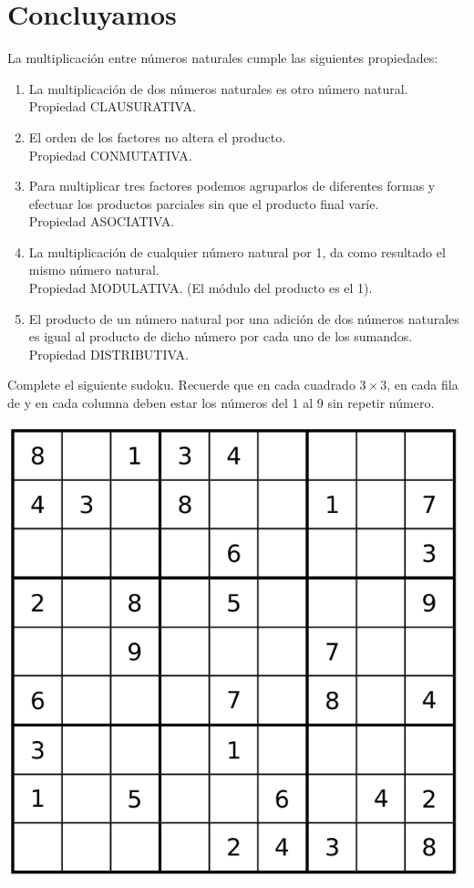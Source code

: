 \documentclass[10pt,twoside]{article}
\begin{document}
\section*{Concluyamos}
La multiplicación entre números naturales cumple las siguientes propiedades:
\begin{enumerate}
\item La multiplicación de dos números naturales es otro número natural.\\
  Propiedad CLAUSURATIVA.
\item El orden de los factores no altera el producto.\\Propiedad CONMUTATIVA.
\item Para multiplicar tres factores podemos agruparlos de diferentes formas y
  efectuar los productos parciales sin que el producto final varíe.\\Propiedad
  ASOCIATIVA.
\item La multiplicación de cualquier número natural por 1, da como resultado el
    mismo número natural.\\Propiedad MODULATIVA. (El módulo del producto
     es el 1).
\item El producto de un número natural por una adición de dos números naturales es igual al producto de dicho número por cada uno de los sumandos.\\Propiedad DISTRIBUTIVA.
\end{enumerate}
Complete el siguiente sudoku. Recuerde que en cada cuadrado $3\times 3$, en cada fila de y en cada columna deben estar los números del 1 al 9 sin repetir n\'{u}mero.
\begin{center}
\includegraphics[scale=.5]{Images/sudoku01.png} 
\end{center}
\end{document}
